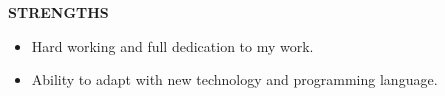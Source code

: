 \documentclass{article}
\begin{document}
\vspace{1cm}






\begin{minipage}{\textwidth}
	\begin{framed}
		\large{\textbf{STRENGTHS}}
	\end{framed}
	\begin{itemize}
		\item Hard working and full dedication to my work.
		\item Ability to adapt with new technology and programming language.
	\end{itemize}		
\end{minipage}



\begin{comment}

\begin{framed}
	\large{\textbf{HOBBIES}}
\end{framed}
\begin{itemize}
	\item Coding
	\item Learning New Technologies.
	\item Daily Workout.
	\item Listening Songs.
\end{itemize}


\end{comment}
\vspace{1cm}
\end{document}
